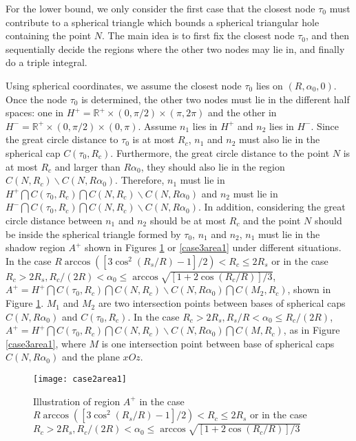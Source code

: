 \documentclass[journal, twoside]{IEEEtran}
\begin{document}
 For the lower bound, we only consider 
the first case that the closest node $\tau_0$ must contribute to a
spherical triangle which bounds a spherical triangular hole containing the point $N$.
The main idea is to first fix the closest node $\tau_0$, and then sequentially
decide the regions where the other two nodes may lie in, and finally
do a triple integral.

Using spherical coordinates, we assume the closest node $\tau_0$ lies on 
$(R, \alpha_0, 0)$. Once the node $\tau_0$ is determined, the other two nodes must lie in 
the different half spaces: one in $H^+ = \mathbb{R}^+ \times (0, \pi/2) \times (\pi, 2\pi) $ 
and the other in $H^- = \mathbb{R}^+ \times (0, \pi/2) \times (0, \pi) $. 
Assume $n_1$ lies in $H^+$ and $n_2$ lies in $H^-$.
Since the great circle distance to $\tau_0$ is at most $R_c$,
$n_1$ and $n_2$ must also lie in the spherical cap $C(\tau_0, R_c)$. Furthermore, the
great circle distance to the point $N$ is at most $R_c$ and larger than $R\alpha_0$, they
should also lie in the region $C(N, R_c) \backslash C(N, R\alpha_0)$. Therefore, 
$n_1$ must lie in $H^+ \bigcap C(\tau_0, R_c) \bigcap C(N, R_c)
\backslash C(N, R\alpha_0) $ and $n_2$ must lie in $H^- \bigcap
C(\tau_0, R_c) \bigcap C(N, R_c) \backslash C(N, R\alpha_0)$. In addition,
considering the great circle distance between $n_1$ and $n_2$ should be at most
$R_c$ and the point $N$ should be inside the spherical triangle formed by $\tau_0$,
$n_1$ and $n_2$, $n_1$ must lie
in the shadow region $A^+$ shown in Figures \ref{case2area1} or \ref{case3area1}
under different situations.
In the case $R \arccos([3\cos^2(R_s/R)-1]/2) < R_c \leq 2R_s$
or in the case $R_c > 2R_s, R_c/(2R) < \alpha_0 \leq \arccos \sqrt{[1+2\cos(R_c/R)]/3}$, 
$A^+ = H^+ \bigcap C(\tau_0, R_c) \bigcap C(N, R_c)
\backslash C(N, R\alpha_0) \bigcap C(M_2, R_c)$, shown in Figure \ref{case2area1}. 
$M_1$ and $M_2$ are two intersection points between bases of spherical caps $C(N, R\alpha_0)$ and
$C(\tau_0, R_c)$. In the case $R_c > 2R_s, R_s/R < \alpha_0 \leq R_c/(2R)$, 
$A^+ = H^+ \bigcap C(\tau_0, R_c) \bigcap C(N, R_c)
\backslash C(N, R\alpha_0) \bigcap C(M, R_c)$, as in Figure \ref{case3area1}, where
$M$ is one intersection point between base of spherical caps $C(N, R\alpha_0)$ and 
the plane $xOz$.
\begin{figure}[ht]
  \centering
  \texttt{[image: case2area1]}
  \caption{Illustration of region $A^+$ in the case $R \arccos([3\cos^2(R_s/R)-1]/2) < R_c \leq 2R_s$ 
  	or in the case $R_c > 2R_s, R_c/(2R) < \alpha_0 \leq \arccos \sqrt{[1+2\cos(R_c/R)]/3}$}
  \label{case2area1}
\end{figure}
\end{document}
